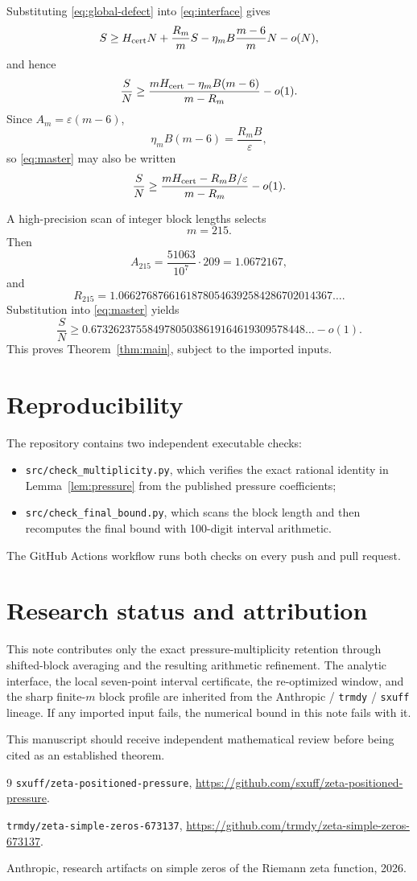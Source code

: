 \documentclass[11pt]{article}
\theoremstyle{remark}
\newcommand{\eps}{\varepsilon}
\begin{document}
Substituting \eqref{eq:global-defect} into \eqref{eq:interface} gives
\[
S\ge H_{\rm cert}N+\frac{R_m}{m}S
-\eta_mB\frac{m-6}{m}N-o(N),
\]
and hence
\begin{equation}\label{eq:master}
\frac SN
\ge
\frac{mH_{\rm cert}-\eta_mB(m-6)}{m-R_m}-o(1).
\end{equation}
Since $A_m=\eps(m-6)$,
\[
\eta_mB(m-6)=\frac{R_mB}{\eps},
\]
so \eqref{eq:master} may also be written
\[
\frac SN
\ge
\frac{mH_{\rm cert}-R_mB/\eps}{m-R_m}-o(1).
\]

A high-precision scan of integer block lengths selects
\[
m=215.
\]
Then
\[
A_{215}=\frac{51063}{10^7}\cdot209=1.0672167,
\]
and
\[
R_{215}=1.06627687661618780546392584286702014367\ldots.
\]
Substitution into \eqref{eq:master} yields
\[
\frac SN
\ge
0.67326237558497805038619164619309578448\ldots-o(1).
\]
This proves Theorem~\ref{thm:main}, subject to the imported inputs.

\section{Reproducibility}

The repository contains two independent executable checks:
\begin{itemize}
\item \texttt{src/check\_multiplicity.py}, which verifies the exact rational identity in Lemma~\ref{lem:pressure} from the published pressure coefficients;
\item \texttt{src/check\_final\_bound.py}, which scans the block length and then recomputes the final bound with 100-digit interval arithmetic.
\end{itemize}
The GitHub Actions workflow runs both checks on every push and pull request.

\section{Research status and attribution}

This note contributes only the exact pressure-multiplicity retention through shifted-block averaging and the resulting arithmetic refinement. The analytic interface, the local seven-point interval certificate, the re-optimized window, and the sharp finite-$m$ block profile are inherited from the Anthropic / \texttt{trmdy} / \texttt{sxuff} lineage. If any imported input fails, the numerical bound in this note fails with it.

This manuscript should receive independent mathematical review before being cited as an established theorem.

\begin{thebibliography}{9}
\texttt{sxuff/zeta-positioned-pressure},
\url{https://github.com/sxuff/zeta-positioned-pressure}.

\texttt{trmdy/zeta-simple-zeros-673137},
\url{https://github.com/trmdy/zeta-simple-zeros-673137}.

Anthropic, research artifacts on simple zeros of the Riemann zeta function, 2026.
\end{thebibliography}
\end{document}
